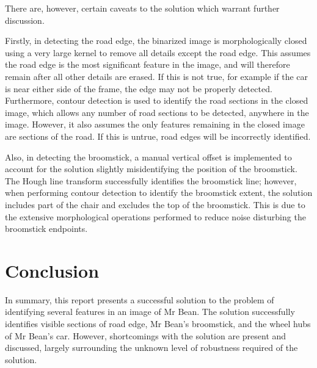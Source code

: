 There are, however, certain caveats to the solution which warrant further discussion.

Firstly, in detecting the road edge, the binarized image is morphologically closed using a very large kernel to remove all details except the road edge. This assumes the road edge is the most significant feature in the image, and will therefore remain after all other details are erased. If this is not true, for example if the car is near either side of the frame, the edge may not be properly detected. Furthermore, contour detection is used to identify the road sections in the closed image, which allows any number of road sections to be detected, anywhere in the image. However, it also assumes the only features remaining in the closed image are sections of the road. If this is untrue, road edges will be incorrectly identified.

Also, in detecting the broomstick, a manual vertical offset is implemented to account for the solution slightly misidentifying the position of the broomstick. The Hough line transform successfully identifies the broomstick line; however, when performing contour detection to identify the broomstick extent, the solution includes part of the chair and excludes the top of the broomstick. This is due to the extensive morphological operations performed to reduce noise disturbing the broomstick endpoints.

\section{Conclusion}

In summary, this report presents a successful solution to the problem of identifying several features in an image of Mr Bean. The solution successfully identifies visible sections of road edge, Mr Bean's broomstick, and the wheel hubs of Mr Bean's car. However, shortcomings with the solution are present and discussed, largely surrounding the unknown level of robustness required of the solution.
